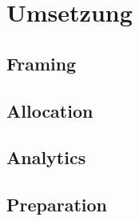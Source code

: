 \newpage
\section{Umsetzung} \label{sec: Umsetzung}

\subsection{Framing} \label{sec: p_Framing}


\subsection{Allocation} \label{sec: p_Allocation}


\subsection{Analytics} \label{sec: p_Analytics}


\subsection{Preparation} \label{sec: p_Preparation}
